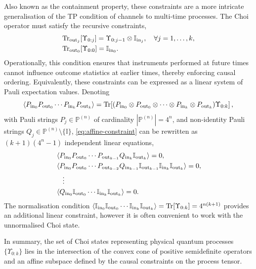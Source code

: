 \begin{enumerate}
    Also known as the containment property, these constraints are a more intricate generalisation of the TP condition of channels to multi-time processes. The Choi operator must satisfy the recursive constraints,
    \begin{equation}\label{eq:affine-constraint}
        \begin{split}
            &\mathrm{Tr}_{\mathrm{out}_j}[\Upsilon_{0:j}] = \Upsilon_{0:j-1} \otimes \mathbb{I}_{\mathrm{in}_j}, \quad \forall j=1,\dots,k, \\
            &\mathrm{Tr}_{\mathrm{out}_0}[\Upsilon_{0:0}] = \mathbb{I}_{\mathrm{in}_0}.
        \end{split}
    \end{equation}
    Operationally, this condition ensures that instruments performed at future times cannot influence outcome statistics at earlier times, thereby enforcing causal ordering. Equivalently, these constraints can be expressed as a linear system of Pauli expectation values. Denoting
    \begin{equation}
        \braket{P_{\mathrm{in}_0}P_{\mathrm{out}_0}\cdots P_{\mathrm{in}_k}P_{\mathrm{out}_k}} = \mathrm{Tr}\!\left[(P_{\mathrm{in}_0}\otimes P_{\mathrm{out}_0} \otimes\cdots\otimes P_{\mathrm{in}_k}\otimes P_{\mathrm{out}_k})\Upsilon_{0:k}\right],
    \end{equation}
with Pauli strings \(P_j \in \mathbb{P}^{(n)}\) of cardinality \(|\mathbb{P}^{(n)}| = 4^n\), and non-identity Pauli strings \(Q_j \in \mathbb{P}^{(n)} \setminus \{\mathbb{I}\}\), \cref{eq:affine-constraint} can be rewritten as \((k+1)(4^n-1)\) independent linear equations,
    \begin{equation}
        \begin{split}
            &\braket{P_{\mathrm{in}_0}P_{\mathrm{out}_0}\cdots P_{\mathrm{out}_{k-1}}Q_{\mathrm{in}_k}\mathbb{I}_{\mathrm{out}_k}} = 0, \\
            &\braket{P_{\mathrm{in}_0}P_{\mathrm{out}_0}\cdots P_{\mathrm{out}_{k-2}}Q_{\mathrm{in}_{k-1}}\mathbb{I}_{\mathrm{out}_{k-1}}\mathbb{I}_{\mathrm{in}_k}\mathbb{I}_{\mathrm{out}_k}} = 0, \\
            &\quad\vdots \\
            &\braket{Q_{\mathrm{in}_0}\mathbb{I}_{\mathrm{out}_0}\cdots \mathbb{I}_{\mathrm{in}_k}\mathbb{I}_{\mathrm{out}_k}} = 0.
        \end{split}
    \end{equation}
    The normalisation condition \(\braket{\mathbb{I}_{\mathrm{in}_0}\mathbb{I}_{\mathrm{out}_0}\cdots \mathbb{I}_{\mathrm{in}_k}\mathbb{I}_{\mathrm{out}_k}} = \mathrm{Tr}{[\Upsilon_{0:k}]} = 4^{n(k+1)}\) provides an additional linear constraint, however it is often convenient to work with the unnormalised Choi state. 
\end{enumerate}
In summary, the set of Choi states representing physical quantum processes \(\{\Upsilon_{0:k}\}\) lies in the intersection of the convex cone of positive semidefinite operators and an affine subspace defined by the causal constraints on the process tensor.

